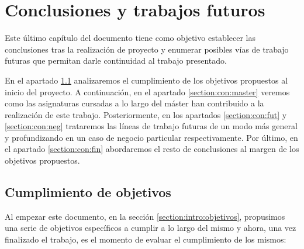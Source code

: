 \chapter{Conclusiones y trabajos futuros}
\label{chapter:conclusiones}

Este último capítulo del documento tiene como objetivo establecer las conclusiones tras la realización de proyecto y enumerar posibles vías de trabajo futuras que permitan darle continuidad al trabajo presentado.

En el apartado \ref{section:con:obj} analizaremos el cumplimiento de los objetivos propuestos al inicio del proyecto. A continuación, en el apartado \ref{section:con:master} veremos como las asignaturas cursadas  a lo largo del máster han contribuido a la realización de este trabajo.  Posteriormente, en los apartados \ref{section:con:fut} y \ref{section:con:neg} trataremos las líneas de trabajo futuras de un modo más general y profundizando en un caso de negocio particular respectivamente. Por último, en el apartado \ref{section:con:fin} abordaremos el resto de conclusiones al margen de los objetivos propuestos. 




\section{Cumplimiento de objetivos}
\label{section:con:obj}

Al empezar este documento, en la sección \ref{section:intro:objetivos}, propusimos una serie de objetivos específicos a cumplir a lo largo del mismo y ahora, una vez finalizado el trabajo, es el momento de evaluar el cumplimiento de los mismos: 

